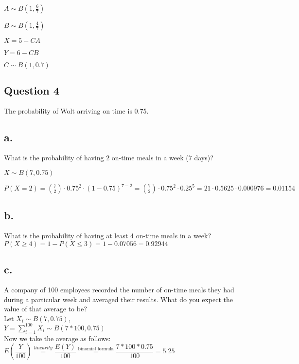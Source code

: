 \documentclass[12pt]{article}
\newcommand\tab[1][1cm]{\hspace*{#1}}
\begin{document}
$ A \sim B(1, \frac{6}{7}) $

$ B \sim B(1, \frac{4}{7}) $

$ X = 5 + CA $

$ Y = 6 - CB $

$ C \sim B(1, 0.7) $

\newpage

\begin{center}
\section*{Question 4}
\end{center}

The probability of Wolt arriving on time is 0.75.

\subsection*{a.} 

What is the probability of having 2 on-time meals in a week (7 days)?

$ X \sim B(7, 0.75) $

$ P(X=2) = \binom{7}{2} \cdot 0.75^2 \cdot(1-0.75)^{7-2} = \binom{7}{2} \cdot 0.75^2 \cdot 0.25^5 = 21 \cdot 0.5625 \cdot 0.000976 = 0.01154 $

\subsection*{b.}

What is the probability of having at least 4 on-time meals in a week? \\

$ P(X \geq 4) =  1 - P(X \leq 3) = 1 - 0.07056 = 0.92944$ 

\subsection*{c.}

\tab A company of 100 employees recorded the number of on-time meals they had during a particular week and averaged their results. What do you expect the value of that average to be? \\

Let $X_i \sim B(7, 0.75) $, \\

$Y = \sum_{i=1}^{100} X_i \sim B(7* 100, 0.75) $\\

Now we take the average as follows: \\

$E(\dfrac{Y}{100}) \stackrel{linearity}{=} \dfrac{E(Y)}{100} \stackrel{\text{binomial formula}}{=} \dfrac{7*100*0.75}{100}  = 5.25 $

    
\end{document}
